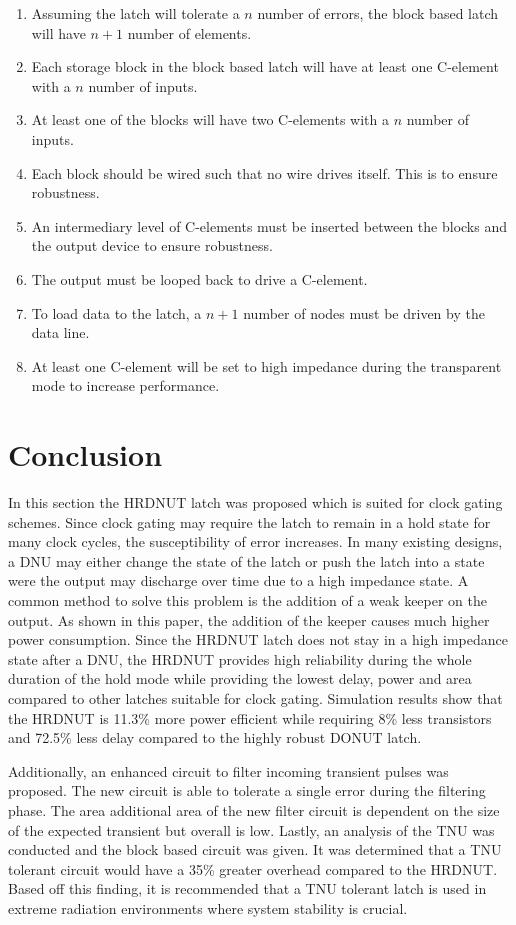 \begin{enumerate}
	\item Assuming the latch will tolerate a $n$ number of errors, the block based latch will have $n+1$ number of elements.
	\item Each storage block in the block based latch will have at least one C-element with a $n$ number of inputs.
	\item At least one of the blocks will have two C-elements with a $n$ number of inputs.
	\item Each block should be wired such that no wire drives itself. This is to ensure robustness.
	\item An intermediary level of C-elements must be inserted between the blocks and the output device to ensure robustness.
	\item The output must be looped back to drive a C-element.
	\item To load data to the latch, a $n+1$ number of nodes must be driven by the data line. 
	\item At least one C-element will be set to high impedance during the transparent mode to increase performance.
\end{enumerate}
 
\section{Conclusion} \label{sec:conc}
In this section the HRDNUT latch was proposed which is suited for clock gating schemes. Since clock gating may require the latch to remain in a hold state for many clock cycles, the susceptibility of error increases. In many existing designs, a DNU may either change the state of the latch or push the latch into a state were the output may discharge over time due to a high impedance state. A common method to solve this problem is the addition of a weak keeper on the output. As shown in this paper, the addition of the keeper causes much higher power consumption. Since the HRDNUT latch does not stay in a high impedance state after a DNU, the HRDNUT provides high reliability during the whole duration of the hold mode while providing the lowest delay, power and area compared to other latches suitable for clock gating. Simulation results show that the HRDNUT is 11.3\% more power efficient while requiring 8\% less transistors and 72.5\% less delay compared to the highly robust DONUT latch. 

Additionally, an enhanced circuit to filter incoming transient pulses was proposed. The new circuit is able to tolerate a single error during the filtering phase. The area additional area of the new filter circuit is dependent on the size of the expected transient but overall is low. Lastly, an analysis of the TNU was conducted and the block based circuit was given. It was determined that a TNU tolerant circuit would have a 35\% greater overhead compared to the HRDNUT. Based off this finding, it is recommended that a TNU tolerant latch is used in extreme radiation environments where system stability is crucial.